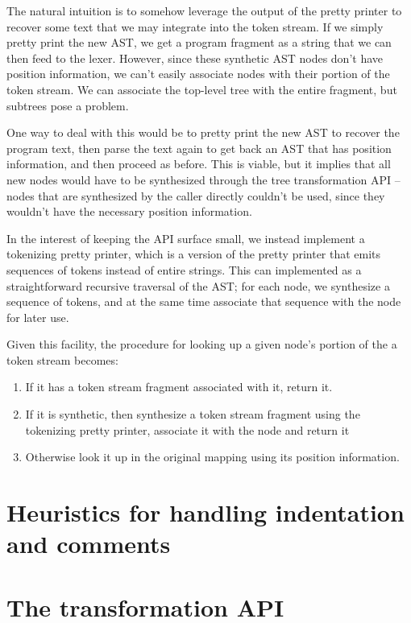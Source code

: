 The natural intuition is to somehow leverage the output of the pretty printer
to recover some text that we may integrate into the token stream. If we simply
pretty print the new AST, we get a program fragment as a string that we can
then feed to the lexer. However, since these synthetic AST nodes don't have
position information, we can't easily associate nodes with their portion of the
token stream. We can associate the top-level tree with the entire fragment, but
subtrees pose a problem.

One way to deal with this would be to pretty print the new AST to recover the
program text, then parse the text again to get back an AST that has position
information, and then proceed as before. This is viable, but it implies that
all new nodes would have to be synthesized through the tree transformation API
-- nodes that are synthesized by the caller directly couldn't be used, since
they wouldn't have the necessary position information.

In the interest of keeping the API surface small, we instead implement a
tokenizing pretty printer, which is a version of the pretty printer that emits
sequences of tokens instead of entire strings. This can implemented as a
straightforward recursive traversal of the AST; for each node, we synthesize a
sequence of tokens, and at the same time associate that sequence with the node
for later use.

Given this facility, the procedure for looking up a given node's portion of the
a token stream becomes:

\begin{enumerate}
  \item If it has a token stream fragment associated with it, return it.
  \item If it is synthetic, then synthesize a token stream fragment using the
  tokenizing pretty printer, associate it with the node and return it
  \item Otherwise look it up in the original mapping using its position information.
\end{enumerate}

\section{Heuristics for handling indentation and comments}

\section{The transformation API}

